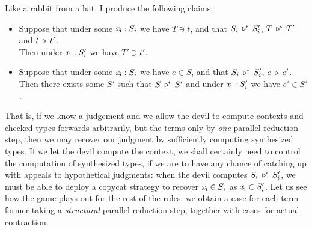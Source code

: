 \documentclass[format=acmsmall, screen, review, anonymous, timestamp]{acmart}
\newcommand{\V}[1]{\purple{\mathit{#1}}}
\newcommand{\x}[1]{\V{x_{\mathrm{#1}}}}
\begin{document}
Like a rabbit from a hat, I produce the following claims:
\begin{itemize}
\item Suppose that under some $\x{i} : S_i$ we have $T\ni t$, and that $S_i\:\triangleright^{\!\ast}\,S'_i$, $T\:\triangleright^{\!\ast}\,T'$ and $t\:\triangleright\,t'$.\\Then under $\x{i} : S'_i$ we have $T'\ni t'$.
\item Suppose that under some $\x{i} : S_i$ we have $e\in S$, and that $S_i\:\triangleright^{\!\ast}\,S'_i$, $e\:\triangleright\,e'$.\\Then there exists some $S'$ such that $S\:\triangleright^{\!\ast}\,S'$ and under $\x{i} : S'_i$ we have $e'\in S'$.
\end{itemize}
That is, if we know a judgement and we allow the devil to compute contexts and checked types forwards arbitrarily, but the terms only by \emph{one} parallel reduction step, then we may recover our judgment by sufficiently computing synthesized types. If we let the devil compute the context, we shall certainly need to control the computation of synthesized types, if we are to have any chance of catching up with appeals to hypothetical judgments: when the devil computes $S_i\:\triangleright^{\!\ast}\,S'_i$, we must be able to deploy a copycat strategy to recover $\x{i}\in S_i$ as $\x{i}\in S'_i$. Let us see how the game plays out for the rest of the rules: we obtain a case for each term former taking a \emph{structural} parallel reduction step, together with cases for actual contraction.
\end{document}
